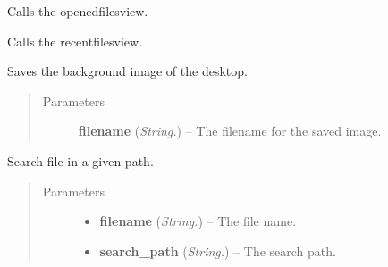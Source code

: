 \documentclass[letterpaper,10pt,english]{sphinxmanual}
\begin{document}

\begin{fulllineitems}
\label{api:utils.OpenedFilesQuery}
Calls the openedfilesview.

\end{fulllineitems}


\begin{fulllineitems}
\label{api:utils.RecentFilesQuery}
Calls the recentfilesview.

\end{fulllineitems}


\begin{fulllineitems}
\label{api:utils.SaveScreen}
Saves the background image of the desktop.
\begin{quote}\begin{description}
\item[{Parameters}] \leavevmode
\textbf{filename} (\emph{String.}) -- The filename for the saved image.

\end{description}\end{quote}

\end{fulllineitems}


\begin{fulllineitems}
\label{api:utils.SearchFile}
Search file in a given path.
\begin{quote}\begin{description}
\item[{Parameters}] \leavevmode\begin{itemize}
\item {} 
\textbf{filename} (\emph{String.}) -- The file name.

\item {} 
\textbf{search\_path} (\emph{String.}) -- The search path.

\end{itemize}

\end{description}\end{quote}

\end{fulllineitems}
\end{document}
